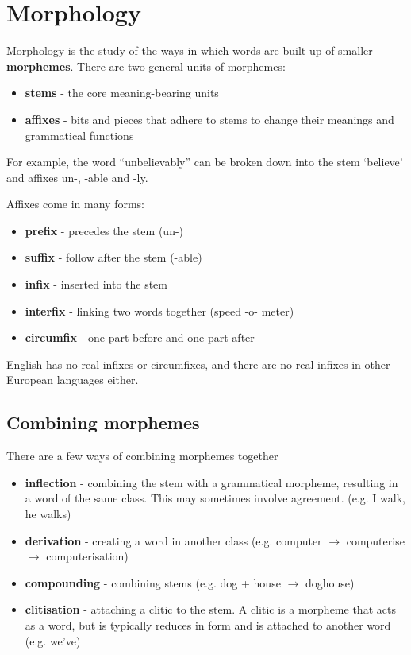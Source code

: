 \documentclass[Report.tex]{subfiles}
\begin{document}
\section{Morphology}
Morphology is the study of the ways in which words are built up of
smaller \textbf{morphemes}. There are two general units of morphemes:
\begin{itemize}
\item \textbf{stems} - the core meaning-bearing units
\item \textbf{affixes} - bits and pieces that adhere to stems to change
their meanings and grammatical functions
\end{itemize}
For example, the word ``unbelievably'' can be broken down into the
stem `believe' and affixes un-, -able and -ly.

Affixes come in many forms:
\begin{itemize}
	\item \textbf{prefix} - precedes the stem (un-)
	\item \textbf{suffix} - follow after the stem (-able)
	\item \textbf{infix} - inserted into the stem
	\item \textbf{interfix} - linking two words together (speed -o- meter)
	\item \textbf{circumfix} - one part before and one part after
\end{itemize}
English has no real infixes or circumfixes, and there are no real infixes
in other European languages either.


\subsection{Combining morphemes}
There are a few ways of combining morphemes together
\begin{itemize}
	\item \textbf{inflection} - combining the stem with a grammatical
		morpheme, resulting in a word of the same class.
		This may sometimes involve agreement.
		(e.g. I walk, he walks)
	\item \textbf{derivation} - creating a word in another class
		(e.g. computer $\rightarrow$ computerise $\rightarrow$ computerisation)
	\item \textbf{compounding} - combining stems (e.g. dog + house $\rightarrow$ doghouse)
	\item \textbf{clitisation} - attaching a clitic to the stem. A clitic is
		a morpheme that acts as a word, but is typically reduces in form
		and is attached to another word (e.g. we've)
\end{itemize}
\end{document}
